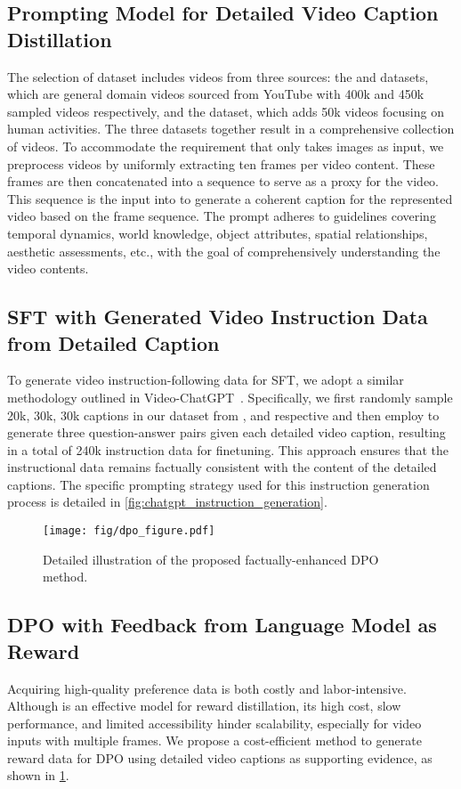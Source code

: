 \subsection{Prompting \gptv Model for Detailed Video Caption Distillation}
\label{subsec:caption_distillation}
The selection of dataset includes videos from three sources: the \webvid and \vidal datasets, which are general domain videos sourced from YouTube with 400k and 450k sampled videos respectively, and the \actnet dataset, which adds 50k videos focusing on human activities. The three datasets together result in a comprehensive collection of \pnum videos. To accommodate the requirement that \gptv only takes images as input, we preprocess videos by uniformly extracting ten frames per video content. These frames are then concatenated into a sequence to serve as a proxy for the video. This sequence is the input into \gptv to generate a coherent caption for the represented video based on the frame sequence. The prompt adheres to guidelines covering temporal dynamics, world knowledge, object attributes, spatial relationships, aesthetic assessments, etc., with the goal of comprehensively understanding the video contents.

\subsection{SFT with Generated Video Instruction Data from Detailed Caption}
\label{subsec:sft}
To generate video instruction-following data for SFT, we adopt a similar methodology outlined in Video-ChatGPT~\citep{li2023videochat}. Specifically, we first randomly sample 20k, 30k, 30k captions in our dataset from \actnet, \webvid and \vidal respective and then employ \chatgpt to generate three question-answer pairs given each detailed video caption, resulting in a total of 240k instruction data for finetuning. This approach ensures that the instructional data remains factually consistent with the content of the detailed captions. The specific prompting strategy used for this instruction generation process is detailed in \cref{fig:chatgpt_instruction_generation}.

\begin{figure}[t!]
    \centering
    \texttt{[image: fig/dpo\_figure.pdf]}
    \caption{Detailed illustration of the proposed factually-enhanced DPO method.}
    \label{fig:dpo_illustration}
\end{figure}

\subsection{DPO with Feedback from Language Model as Reward}
\label{subsec:dpo}
Acquiring high-quality preference data is both costly and labor-intensive. Although \gptv is an effective model for reward distillation, its high cost, slow performance, and limited accessibility hinder scalability, especially for video inputs with multiple frames. We propose a cost-efficient method to generate reward data for DPO using detailed video captions as supporting evidence, as shown in \cref{fig:dpo_illustration}.

